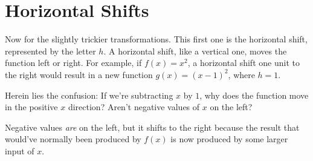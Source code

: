 \clearpage\section{Horizontal Shifts}
Now for the slightly trickier transformations. This first one is the horizontal shift, represented by the letter $h$. A horizontal shift, like a vertical one, moves the function left or right. For example, if $f(x) = x^2$, a horizontal shift one unit to the right would result in a new function $g(x) = (x - 1)^2$, where $h = 1$. 

Herein lies the confusion: If we're subtracting $x$ by $1$, why does the function move in the positive $x$ direction? Aren't negative values of $x$ on the left?

Negative values \textit{are} on the left, but it shifts to the right because the result that would've normally been produced by $f(x)$ is now produced by some larger input of $x$. 

